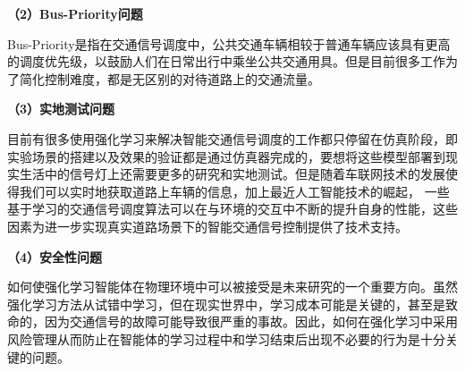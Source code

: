 \textbf{（2）Bus-Priority问题}

Bus-Priority是指在交通信号调度中，公共交通车辆相较于普通车辆应该具有更高的调度优先级，以鼓励人们在日常出行中乘坐公共交通用具。但是目前很多工作为了简化控制难度，都是无区别的对待道路上的交通流量。

\textbf{（3）实地测试问题}

目前有很多使用强化学习来解决智能交通信号调度的工作都只停留在仿真阶段，即实验场景的搭建以及效果的验证都是通过仿真器完成的，要想将这些模型部署到现实生活中的信号灯上还需要更多的研究和实地测试。但是随着车联网技术的发展使得我们可以实时地获取道路上车辆的信息，加上最近人工智能技术的崛起，
一些基于学习的交通信号调度算法可以在与环境的交互中不断的提升自身的性能，这些因素为进一步实现真实道路场景下的智能交通信号控制提供了技术支持。

\textbf{（4）安全性问题}

如何使强化学习智能体在物理环境中可以被接受是未来研究的一个重要方向。虽然强化学习方法从试错中学习，但在现实世界中，学习成本可能是关键的，甚至是致命的，因为交通信号的故障可能导致很严重的事故。因此，如何在强化学习中采用风险管理从而防止在智能体的学习过程中和学习结束后出现不必要的行为是十分关键的问题。

